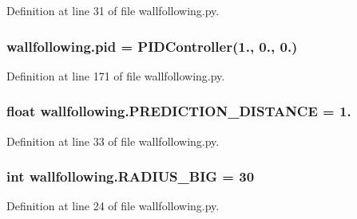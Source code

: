 Definition at line 31 of file wallfollowing.\+py.

\subsubsection[{\texorpdfstring{pid}{pid}}]{\setlength{\rightskip}{0pt plus 5cm}wallfollowing.\+pid = {\bf P\+I\+D\+Controller}(1., 0., 0.)}\hypertarget{namespacewallfollowing_adc9f95e0b626be8ddae98a596a38e7e8}{}\label{namespacewallfollowing_adc9f95e0b626be8ddae98a596a38e7e8}


Definition at line 171 of file wallfollowing.\+py.

\subsubsection[{\texorpdfstring{P\+R\+E\+D\+I\+C\+T\+I\+O\+N\+\_\+\+D\+I\+S\+T\+A\+N\+CE}{PREDICTION_DISTANCE}}]{\setlength{\rightskip}{0pt plus 5cm}float wallfollowing.\+P\+R\+E\+D\+I\+C\+T\+I\+O\+N\+\_\+\+D\+I\+S\+T\+A\+N\+CE = 1.}\hypertarget{namespacewallfollowing_a40e67d731c86a71ce7d1b8c17bff0514}{}\label{namespacewallfollowing_a40e67d731c86a71ce7d1b8c17bff0514}


Definition at line 33 of file wallfollowing.\+py.

\subsubsection[{\texorpdfstring{R\+A\+D\+I\+U\+S\+\_\+\+B\+IG}{RADIUS_BIG}}]{\setlength{\rightskip}{0pt plus 5cm}int wallfollowing.\+R\+A\+D\+I\+U\+S\+\_\+\+B\+IG = 30}\hypertarget{namespacewallfollowing_a4b502375f79f9fcc2a823cc60da7bee0}{}\label{namespacewallfollowing_a4b502375f79f9fcc2a823cc60da7bee0}


Definition at line 24 of file wallfollowing.\+py.


